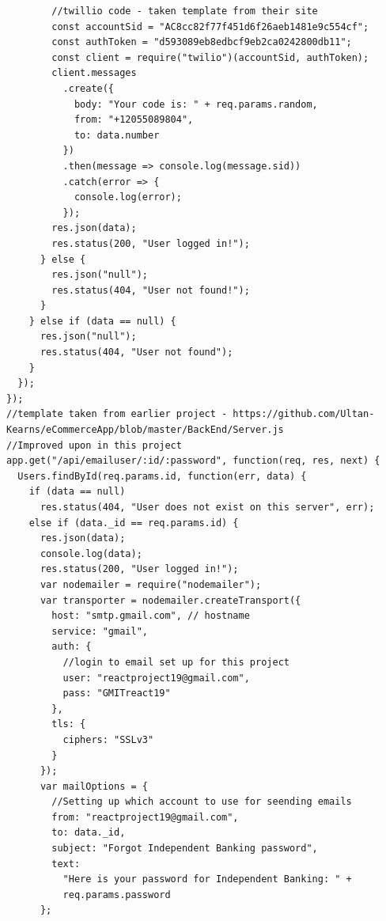 \begin{verbatim}
        //twillio code - taken template from their site
        const accountSid = "AC8cc82f77f451d6f26aeb1481e9c554cf";
        const authToken = "d593089eb8edbcf9eb2ca0242800db11";
        const client = require("twilio")(accountSid, authToken);
        client.messages
          .create({
            body: "Your code is: " + req.params.random,
            from: "+12055089804",
            to: data.number
          })
          .then(message => console.log(message.sid))
          .catch(error => {
            console.log(error);
          });
        res.json(data);
        res.status(200, "User logged in!");
      } else {
        res.json("null");
        res.status(404, "User not found!");
      }
    } else if (data == null) {
      res.json("null");
      res.status(404, "User not found");
    }
  });
});
//template taken from earlier project - https://github.com/Ultan-Kearns/eCommerceApp/blob/master/BackEnd/Server.js
//Improved upon in this project
app.get("/api/emailuser/:id/:password", function(req, res, next) {
  Users.findById(req.params.id, function(err, data) {
    if (data == null)
      res.status(404, "User does not exist on this server", err);
    else if (data._id == req.params.id) {
      res.json(data);
      console.log(data);
      res.status(200, "User logged in!");
      var nodemailer = require("nodemailer");
      var transporter = nodemailer.createTransport({
        host: "smtp.gmail.com", // hostname
        service: "gmail",
        auth: {
          //login to email set up for this project
          user: "reactproject19@gmail.com",
          pass: "GMITreact19"
        },
        tls: {
          ciphers: "SSLv3"
        }
      });
      var mailOptions = {
        //Setting up which account to use for seending emails
        from: "reactproject19@gmail.com",
        to: data._id,
        subject: "Forgot Independent Banking password",
        text:
          "Here is your password for Independent Banking: " +
          req.params.password
      };


\end{verbatim}
